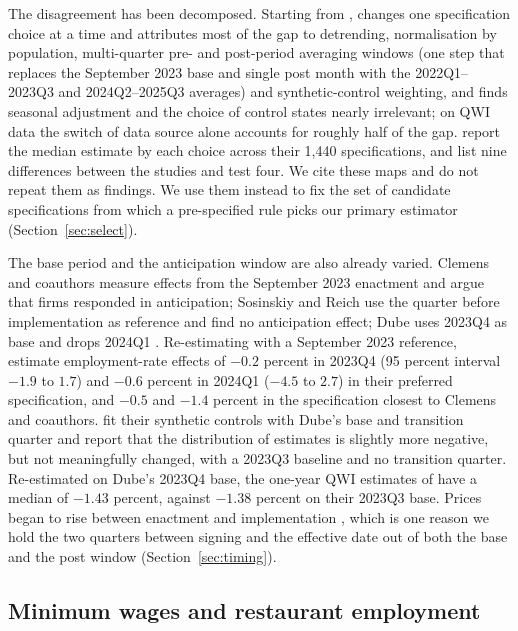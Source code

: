 The disagreement has been decomposed. Starting from \citet{clemens2025did}, \citet[Table~D1]{dube2026labor}
changes one specification choice at a time and attributes most of the gap to detrending,
normalisation by population, multi-quarter pre- and post-period averaging windows (one step that
replaces the September 2023 base and single post month with the 2022Q1--2023Q3 and 2024Q2--2025Q3
averages) and synthetic-control weighting, and finds seasonal adjustment and the choice of
control states nearly irrelevant; on QWI data the switch of data source alone accounts for
roughly half of the gap. \citet[Table~A1]{clemens2026synthetic} report the median estimate by
each choice across their 1,440 specifications, and \citet[Appendix~A]{sosinskiy2026effects} list
nine differences between the studies and test four. We cite these maps and do not repeat them as
findings. We use them instead to fix the set of candidate specifications from which a
pre-specified rule picks our primary estimator (Section~\ref{sec:select}).

The base period and the anticipation window are also already varied. Clemens and coauthors
measure effects from the September 2023 enactment and argue that firms responded in
anticipation; Sosinskiy and Reich use the quarter before implementation as reference and find
no anticipation effect; Dube uses 2023Q4 as base and drops 2024Q1
\citep{clemens2026employment,sosinskiy2026effects,dube2026labor}. Re-estimating with a September
2023 reference, \citet[Table~A3]{sosinskiy2026effects} estimate employment-rate effects of $-0.2$
percent in 2023Q4 (95 percent interval $-1.9$ to $1.7$) and $-0.6$ percent in 2024Q1 ($-4.5$ to
$2.7$) in their preferred specification, and $-0.5$ and $-1.4$ percent in the specification closest
to Clemens and coauthors. \citet[footnote~5]{clemens2026synthetic} fit their synthetic controls with
Dube's base and transition quarter and report that the distribution of estimates is slightly
more negative, but not meaningfully changed, with a 2023Q3 baseline and no transition quarter.
Re-estimated on Dube's 2023Q4 base, the one-year QWI estimates of \citet[Table~A3]{clemens2026employment}
have a median of $-1.43$ percent, against $-1.38$ percent on their 2023Q3 base. Prices began to
rise between enactment and implementation \citep{clemens2026prices}, which is one reason we hold
the two quarters between signing and the effective date out of both the base and the post window
(Section~\ref{sec:timing}).

\subsection{Minimum wages and restaurant employment}


